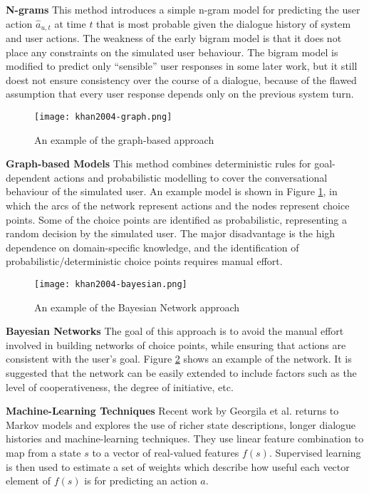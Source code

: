 \textbf{N-grams} This method introduces a simple n-gram model for predicting the user action $\hat{a}_{u,t}$ at time $t$ that is most probable given the dialogue history of system and user actions. The weakness of the early bigram model is that it does not place any constraints on the simulated user behaviour. The bigram model is modified to predict only ``sensible'' user responses in some later work, but it still doest not ensure consistency over the course of a dialogue, because of the flawed assumption that every user response depends only on the previous system turn.

\begin{figure}[h]
  \centering
  \texttt{[image: khan2004-graph.png]}\\
  \caption{An example of the graph-based approach}\label{fig:khan04-graph}
\end{figure}

\textbf{Graph-based Models} This method combines deterministic rules for goal-dependent actions and probabilistic modelling to cover the conversational behaviour of the simulated user. An example model is shown in Figure \ref{fig:khan04-graph}, in which the arcs of the network represent actions and the nodes represent choice points. Some of the choice points are identified as probabilistic, representing a random decision by the simulated user. The major disadvantage is the high dependence on domain-specific knowledge, and the identification of probabilistic/deterministic choice points requires manual effort.

\begin{figure}[h]
  \centering
  \texttt{[image: khan2004-bayesian.png]}\\
  \caption{An example of the Bayesian Network approach}\label{fig:khan04-bayesian}
\end{figure}


\textbf{Bayesian Networks} The goal of this approach is to avoid the manual effort involved in building networks of choice points, while ensuring that actions are consistent with the user's goal. Figure \ref{fig:khan04-bayesian} shows an example of the network. It is suggested that the network can be easily extended to include factors such as the level of cooperativeness, the degree of initiative, etc.

\textbf{Machine-Learning Techniques} Recent work by Georgila et al. \cite{Georgila2005} returns to Markov models and explores the use of richer state descriptions, longer dialogue histories and machine-learning techniques. They use linear feature combination to map from a state $s$ to a vector of real-valued features $f(s)$. Supervised learning is then used to estimate a set of weights which describe how useful each vector element of $f(s)$ is for predicting an action $a$.

